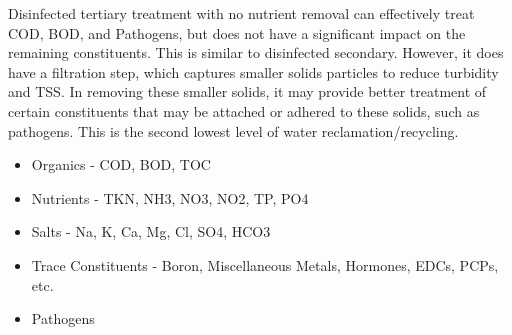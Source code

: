 \begin{enumerate}
Disinfected tertiary treatment with no nutrient removal can effectively treat COD, BOD, and Pathogens, but does not have a significant impact on the remaining constituents.  This is similar to disinfected secondary.  However, it does have a filtration step, which captures smaller solids particles to reduce turbidity and TSS.  In removing these smaller solids, it may provide better treatment of certain constituents that may be attached or adhered to these solids, such as pathogens.  This is the second lowest level of water reclamation/recycling.
\begin{itemize}
\item Organics - COD, BOD, TOC
\item Nutrients - TKN, NH3, NO3, NO2, TP, PO4
\item Salts - Na, K, Ca, Mg, Cl, SO4, HCO3
\item Trace Constituents - Boron, Miscellaneous Metals, Hormones, EDCs, PCPs, etc.
\item Pathogens
\end{itemize}


\end{enumerate}

